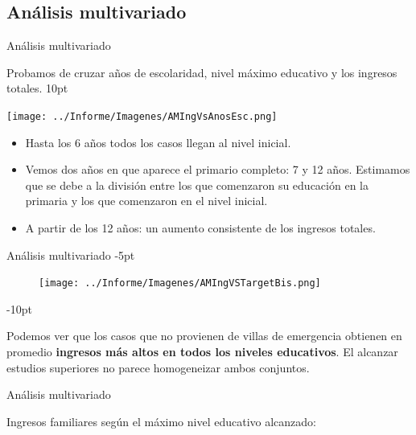 \documentclass[pdf]{beamer}
\def\vspace{}%
\begin{document}
{    \subsection{Análisis multivariado}

\begin{frame}{Análisis multivariado}
    \footnotesize

    Probamos de cruzar años de escolaridad, nivel máximo educativo y los ingresos totales.
    \vspace{10pt}

    \begin{minipage}{0.5\textwidth}
        \texttt{[image: ../Informe/Imagenes/AMIngVsAnosEsc.png]}
    \end{minipage}
\begin{minipage}{0.45\textwidth}
    \begin{itemize}
        \footnotesize
        \justifying%
        \item Hasta los 6 años todos los casos llegan al nivel inicial.
        \item Vemos dos años en que aparece el primario completo: 7 y 12 años. Estimamos que se debe a la división entre los que comenzaron su educación en la primaria y los que comenzaron en el nivel inicial.
        \item A partir de los 12 años: un aumento consistente de los ingresos totales.
    \end{itemize}
\end{minipage}
\end{frame} 

\begin{frame}{Análisis multivariado}
    \vspace{-5pt}

    \begin{figure}[H]
        \texttt{[image: ../Informe/Imagenes/AMIngVSTargetBis.png]}
    \end{figure}
    \vspace{-10pt}
    
    
    Podemos ver que los casos que no provienen de villas de emergencia obtienen en promedio \textbf{ingresos más altos en todos los niveles educativos}. El alcanzar estudios superiores no parece homogeneizar ambos conjuntos. 
\end{frame}

\begin{frame}{Análisis multivariado}

    Ingresos familiares según el máximo nivel educativo alcanzado:


\end{frame}}
\end{document}
